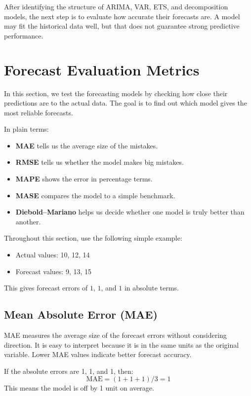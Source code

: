 \documentclass[12pt,a4paper]{article}
\begin{document}
After identifying the structure of ARIMA, VAR, ETS, and decomposition models, the next step is to evaluate how accurate their forecasts are. A model may fit the historical data well, but that does not guarantee strong predictive performance.

\section{Forecast Evaluation Metrics}

In this section, we test the forecasting models by checking how close their predictions are to the actual data. The goal is to find out which model gives the most reliable forecasts.

In plain terms:
\begin{itemize}
    \item \textbf{MAE} tells us the average size of the mistakes.
    \item \textbf{RMSE} tells us whether the model makes big mistakes.
    \item \textbf{MAPE} shows the error in percentage terms.
    \item \textbf{MASE} compares the model to a simple benchmark.
    \item \textbf{Diebold--Mariano} helps us decide whether one model is truly better than another.
\end{itemize}

Throughout this section, use the following simple example:
\begin{itemize}
    \item Actual values: 10, 12, 14
    \item Forecast values: 9, 13, 15
\end{itemize}

This gives forecast errors of $1$, $1$, and $1$ in absolute terms.

\subsection{Mean Absolute Error (MAE)}

MAE measures the average size of the forecast errors without considering direction. It is easy to interpret because it is in the same units as the original variable. Lower MAE values indicate better forecast accuracy.

\begin{example}
If the absolute errors are 1, 1, and 1, then:
\[ \mathrm{MAE} = (1 + 1 + 1) / 3 = 1 \]
This means the model is off by 1 unit on average.
\end{example}
\end{document}

